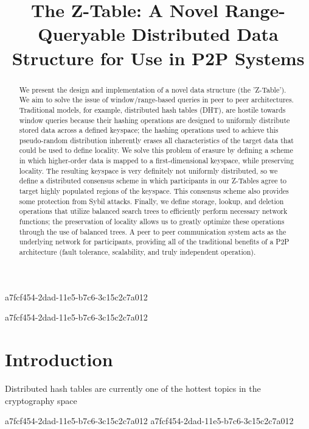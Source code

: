 \documentclass[12pt]{article}
\title{The Z-Table: A Novel Range-Queryable Distributed Data Structure for Use in P2P Systems}
\begin{document}
a7fcf454-2dad-11e5-b7c6-3c15c2c7a012
\maketitle

a7fcf454-2dad-11e5-b7c6-3c15c2c7a012\begin{abstract}
We present the design and implementation of a novel data structure (the 'Z-Table'). We aim to solve the issue of window/range-based queries in peer to peer architectures. Traditional models, for example,  distributed hash tables (DHT), are hostile towards window queries because their hashing operations are designed to uniformly distribute stored data across a defined keyspace; the hashing operations used to achieve this pseudo-random distribution inherently erases all characteristics of the target data that could be used to define locality. We solve this problem of erasure by defining a scheme in which higher-order data is mapped to a first-dimensional keyspace, while preserving locality. The resulting keyspace is very definitely not uniformly distributed, so we define a distributed consensus scheme in which participants in our Z-Tables agree to target highly populated regions of the keyspace. This consensus scheme also provides some protection from Sybil attacks. Finally, we define storage, lookup, and deletion operations that utilize balanced search trees to efficiently perform necessary network functions; the preservation of locality allows us to greatly optimize these operations through the use of balanced trees. A peer to peer communication system acts as the underlying network for participants, providing all of the traditional benefits of a P2P architecture (fault tolerance, scalability, and truly independent operation).
\end{abstract}


\newpage
\section{Introduction}
Distributed hash tables are currently one of the hottest topics in the cryptography space~\cite{Stoica:2001dj,Rowstron:2001ea,Ratnasamy:2001wn}

a7fcf454-2dad-11e5-b7c6-3c15c2c7a012\printbibliography
a7fcf454-2dad-11e5-b7c6-3c15c2c7a012
\end{document}
